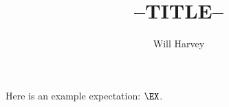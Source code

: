 \documentclass[12pt]{article}
\title{--TITLE--}
\author{Will Harvey}
\date{}
\begin{document}
\setlength{\droptitle}{-1.5cm}
\maketitle
\vspace{-1cm}

Here is an example expectation: $\EX$.
\end{document}
